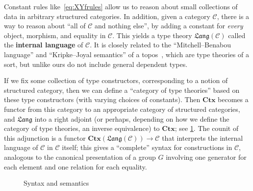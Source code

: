 \documentclass[12pt]{article}
\def\m#1{\llbracket#1\rrbracket}
\def\C{\mathscr{C}}
\def\Ctx{\mathbf{Ctx}}
\def\Lang{\mathfrak{Lang}}
\numberwithin{equation}{section}
\begin{document}
Constant rules like~\eqref{eq:XYfrules} allow us to reason about small collections of data in arbitrary structured categories.
In addition, given a category $\C$, there is a way to reason about ``all of $\C$ and nothing else'', by adding a constant for \emph{every} object, morphism, and equality in $\C$.
This yields a type theory $\Lang(\C)$ called the \textbf{internal language} of $\C$.
It is closely related to the ``Mitchell--Benabou language'' and ``Kripke--Joyal semantics'' of a topos~\cite{mm:shv-gl,ptj:elephant,bell:topos-lst,goldblatt:topoi}, which are type theories of a sort, but unlike ours do not include general dependent types.

If we fix some collection of type constructors, corresponding to a notion of structured category, then we can define a ``category of type theories'' based on these type constructors (with varying choices of constants).
Then $\Ctx$ becomes a functor from this category to an appropriate category of structured categories, and $\Lang$ into a right adjoint (or perhaps, depending on how we define the category of type theories, an inverse equivalence) to $\Ctx$; see \cref{fig:internal-logic}.
The counit of this adjunction is a functor $\Ctx(\Lang(\C)) \to \C$ that interprets the internal language of $\C$ in $\C$ itself; this gives a ``complete'' syntax for constructions in $\C$, analogous to the canonical presentation of a group $G$ involving one generator for each element and one relation for each equality.

\begin{figure}
  \centering
  \caption{Syntax and semantics}
  \label{fig:internal-logic}
\end{figure}
\end{document}
